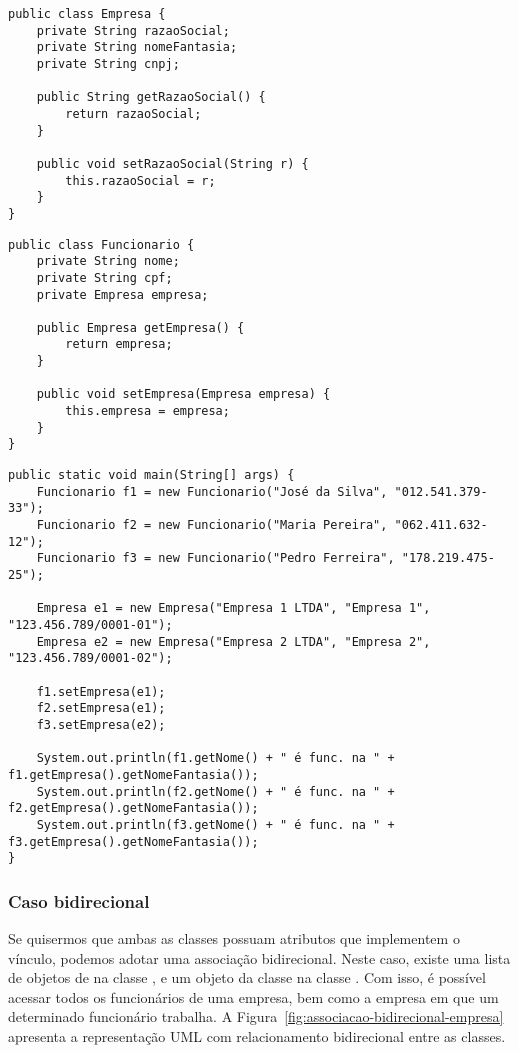\begin{verbatim}
public class Empresa {
	private String razaoSocial;
	private String nomeFantasia;
	private String cnpj;
	
	public String getRazaoSocial() {
		return razaoSocial; 
	}
	
	public void setRazaoSocial(String r) {
		this.razaoSocial = r; 
	}
}
\end{verbatim}

\begin{verbatim}
public class Funcionario {
	private String nome;
	private String cpf;
	private Empresa empresa;
	
	public Empresa getEmpresa() {
		return empresa; 
	}
	
	public void setEmpresa(Empresa empresa) {
		this.empresa = empresa;
	}
}
\end{verbatim}

\begin{verbatim}
public static void main(String[] args) {
	Funcionario f1 = new Funcionario("José da Silva", "012.541.379-33");
	Funcionario f2 = new Funcionario("Maria Pereira", "062.411.632-12");
	Funcionario f3 = new Funcionario("Pedro Ferreira", "178.219.475-25");
	
	Empresa e1 = new Empresa("Empresa 1 LTDA", "Empresa 1", "123.456.789/0001-01");
	Empresa e2 = new Empresa("Empresa 2 LTDA", "Empresa 2", "123.456.789/0001-02");
	
	f1.setEmpresa(e1);
	f2.setEmpresa(e1);
	f3.setEmpresa(e2);
	
	System.out.println(f1.getNome() + " é func. na " + f1.getEmpresa().getNomeFantasia());
	System.out.println(f2.getNome() + " é func. na " + f2.getEmpresa().getNomeFantasia());
	System.out.println(f3.getNome() + " é func. na " + f3.getEmpresa().getNomeFantasia());
}
\end{verbatim}
 
\subsubsection{Caso bidirecional}

Se quisermos que ambas as classes possuam atributos que implementem o vínculo, podemos adotar uma associação bidirecional. Neste caso, existe uma lista de objetos de  na classe , e um objeto da classe  na classe . Com isso, é possível acessar todos os funcionários de uma empresa, bem como a empresa em que um determinado funcionário trabalha. A Figura~\ref{fig:associacao-bidirecional-empresa} apresenta a representação UML com relacionamento bidirecional entre as classes.

